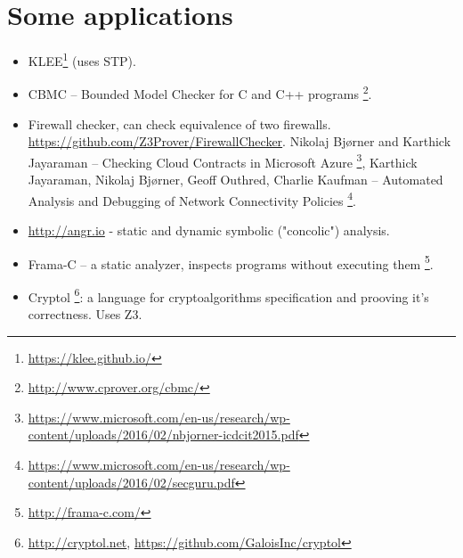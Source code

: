 \chapter{Some applications}

\begin{itemize}

\item KLEE\footnote{\url{https://klee.github.io/}} (uses STP).

\item CBMC -- Bounded Model Checker for C and C++ programs
\footnote{\url{http://www.cprover.org/cbmc/}}.

\item Firewall checker, can check equivalence of two firewalls.
\url{https://github.com/Z3Prover/FirewallChecker}.
Nikolaj Bjørner and Karthick Jayaraman -- Checking Cloud Contracts in Microsoft Azure
\footnote{\url{https://www.microsoft.com/en-us/research/wp-content/uploads/2016/02/nbjorner-icdcit2015.pdf}},
Karthick Jayaraman, Nikolaj Bjørner, Geoff Outhred, Charlie Kaufman -- Automated Analysis and Debugging of Network Connectivity Policies
\footnote{\url{https://www.microsoft.com/en-us/research/wp-content/uploads/2016/02/secguru.pdf}}.

\item \url{http://angr.io} - static and dynamic symbolic ("concolic") analysis.

\item Frama-C -- a static analyzer, inspects programs without executing them
\footnote{\url{http://frama-c.com/}}.

\item Cryptol
\footnote{\url{http://cryptol.net}, \url{https://github.com/GaloisInc/cryptol}}:
a language for cryptoalgorithms specification and prooving it's correctness. Uses Z3.

\end{itemize}
